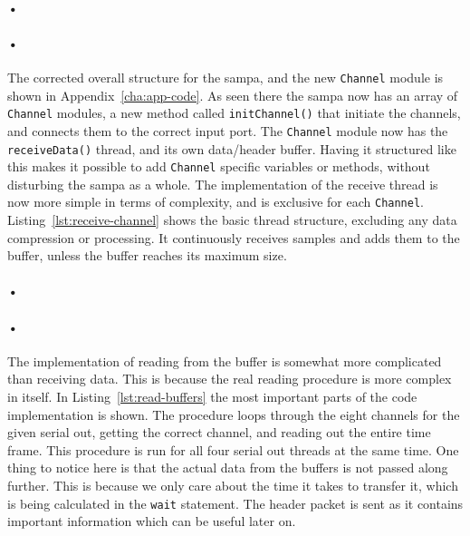 \documentclass[a4paper, 12pt]{report}
\newcommand{\codeword}[1]{\texttt{#1}}
\begin{document}
\paragraph{•}
\begin{minipage}{\linewidth}

\end{minipage}

\paragraph{•}
The corrected overall structure for the \gls{sampa}, and the new \codeword{Channel} module is shown in Appendix~\ref{cha:app-code}.
As seen there the \gls{sampa} now has an array of \codeword{Channel} modules, a new method called \codeword{initChannel()} that initiate the channels, and connects them to the correct input port.
The \codeword{Channel} module now has the \codeword{receiveData()} thread, and its own data/header buffer.
Having it structured like this makes it possible to add \codeword{Channel} specific variables or methods, without disturbing the \gls{sampa} as a whole.
The implementation of the receive thread is now more simple in terms of complexity, and is exclusive for each \codeword{Channel}.
Listing~\ref{lst:receive-channel} shows the basic thread structure, excluding any data compression or processing.
It continuously receives samples and adds them to the buffer, unless the buffer reaches its maximum size.

\paragraph{•}
\begin{minipage}{\linewidth}

\end{minipage}

\paragraph{•}
The implementation of reading from the buffer is somewhat more complicated than receiving data.
This is because the real reading procedure is more complex in itself.
In Listing~\ref{lst:read-buffers} the most important parts of the code implementation is shown.
The procedure loops through the eight channels for the given serial out, getting the correct channel, and reading out the entire time frame.
This procedure is run for all four serial out threads at the same time.
One thing to notice here is that the actual data from the buffers is not passed along further.
This is because we only care about the time it takes to transfer it, which is being calculated in the \codeword{wait} statement.
The header packet is sent as it contains important information which can be useful later on.
\end{document}
